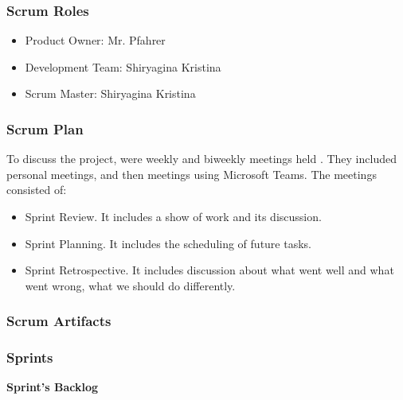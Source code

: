 \documentclass{scrartcl}
\begin{document}
 	    
 	    
  		\subsubsection{Scrum Roles}
  		\begin{itemize}
  		\item Product Owner: Mr. Pfahrer
  		\item Development Team: Shiryagina Kristina
  		\item Scrum Master: Shiryagina Kristina
  		
  		\end{itemize}
  	    \subsubsection{Scrum Plan}
  	    To discuss the project, were weekly and biweekly meetings held . They included personal meetings, and then meetings using Microsoft Teams. The meetings consisted of:
  	    \begin{itemize}
  	    \item Sprint Review. It includes a show of work and its discussion.
  	    \item Sprint Planning. It includes the scheduling of future tasks.
  	    \item Sprint Retrospective. It includes discussion about what went well and what went wrong, what we should do differently. 
  	    \end{itemize}
  		\subsubsection{Scrum Artifacts }
  		
  		\subsubsection{Sprints}
  		
%
\textbf{Sprint's Backlog}
\end{document}

